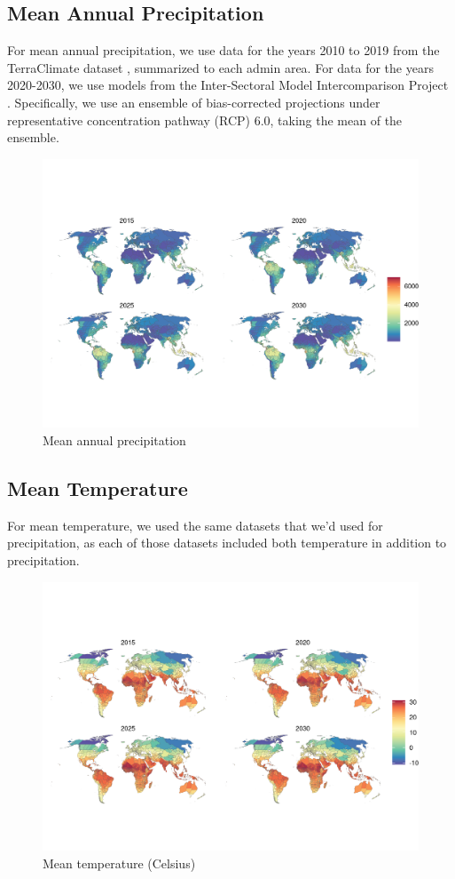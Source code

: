 \documentclass{article}
\begin{document}
\subsection{Mean Annual Precipitation}
For mean annual precipitation, we use data for the years 2010 to 2019 from the TerraClimate dataset \citep{abatzoglou2018terraclimate}, summarized to each admin area.  For data for the years 2020-2030, we use models from the Inter-Sectoral Model Intercomparison Project \citep{warszawski2014inter}.  Specifically, we use an ensemble of bias-corrected projections under representative concentration pathway (RCP) 6.0, taking the mean of the ensemble.

\begin{figure}[H]
  \centering
  \includegraphics[width=\linewidth]{img/covars/precip.png}
  \caption{Mean annual precipitation}
\end{figure}

\subsection{Mean Temperature}
For mean temperature, we used the same datasets that we'd used for precipitation, as each of those datasets included both temperature in addition to precipitation.

\begin{figure}[H]
  \centering
  \includegraphics[width=\linewidth]{img/covars/tave.png}
  \caption{Mean temperature (Celsius)}
\end{figure}
\end{document}
